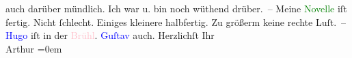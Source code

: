                auch darüber mündlich. Ich war u. bin noch wüthend {\pb}drüber. – Meine \textcolor{green}{Novelle}{} iſt
               fertig. Nicht ſchlecht. Einiges kleinere halbfertig. Zu größerm keine rechte
               Luſt. –\pend
           \pstart
           \textcolor{blue}{Hugo}{}\ledrightnote{\textcolor{blue}{Hugo von Hofmannsthal}} iſt in der \textcolor{pink}{Brühl}{}\ledrightnote{\textcolor{pink}{Brühl}}. \textcolor{blue}{Guſtav}{}\ledrightnote{\textcolor{blue}{Gustav Schwarzkopf}} auch.\pend
           \pstart
           Herzlichſt Ihr{\\[\baselineskip]}\spacefill\mbox{Arthur}\pend
           \leftskip=0em{}\endnumbering{}  
      